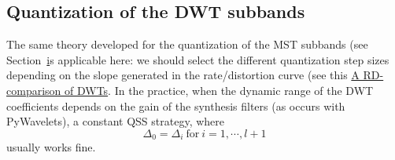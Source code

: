 \subsection{Quantization of the DWT subbands}

The same theory developed for the quantization of the MST subbands
(see Section~\href{sec:quantization_subbands_spatial} is applicable
here: we should select the different quantization step sizes depending
on the slope generated in the rate/distortion curve (see this
\href{https://github.com/Tecnologias-multimedia/Tecnologias-multimedia.github.io/blob/master/contents/transform_coding/DWT_RD.ipynb}{A
  RD-comparison of DWTs}. In the practice, when the dynamic range of
the DWT coefficients depends on the gain of the synthesis filters (as
occurs with PyWavelets), a constant QSS strategy, where
\begin{equation}
  \Delta_0=\Delta_i~\text{for}~i=1,\cdots,l+1
\end{equation}
usually works fine.
\begin{comment}
The QSSs to be used in the different subbands of a (orthogonal)
decomposition should be inversely\footnote{Remember that if the QSS is
  higher, the quantization error is also higher. Therefore, those
  subbands with higher amplification in the inverse transform should
  be quantized less.} proportional the gain of the synthesis
filters. The gain of a filter corresponds to the L$^2$ norm of its
coefficients, and the final gain applied to a subband depends
logically on the number of times that we have applied the filter in
the cascade. Notice that if we do not know the coefficients, we can
use the algorithm described in
Section~\ref{sec:quantization_subbands_spatial} to find the gain of
the subbands. Notice, however, that in most of the implementations,
the coefficients are already multiplied by the gain, and therefore,
using a constant $\Delta$ for all the subbands we are satisfiying such
requirement.\footnote{This is the reason why we need to use more than
  2 bytes for representing the wavelet coefficients that have been
  generated using 2 bytes samples.}

Finally, notice that if the transform is orthonormal, by definition,
the gain of the analysis and synthesis filters is always 1, and this is also the gain of the subbands. In the notebook
\href{https://github.com/Tecnologias-multimedia/Tecnologias-multimedia.github.io/blob/master/contents/transform_coding/DWT_RD.ipynb}{A
  RD-comparison of DWTs} there is more information on QSS that
can be used in the quantization process.
\end{comment}

